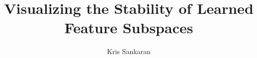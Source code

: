 \documentclass{article}
\title{Visualizing the Stability of Learned \\ Feature Subspaces}
\author{Kris Sankaran}
\begin{document}
\maketitle

\graphicspath{{figure/}}










 
\end{document}
